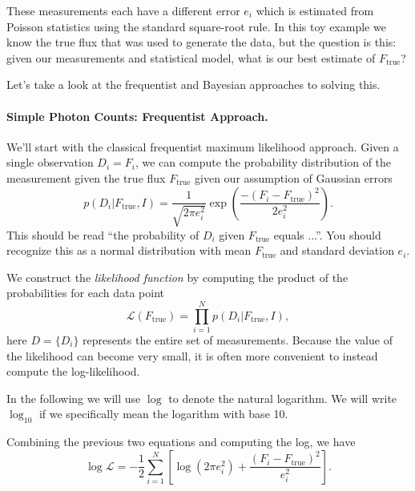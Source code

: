 \documentclass[%
oneside,                 %
final,                   %
10pt]{article}
\newenvironment{notice_mdfboxadmon}[1][]{
\begin{notice_mdfboxmdframed}[frametitle=#1]
}
{
\end{notice_mdfboxmdframed}
}
\begin{document}
These measurements each have a different error $e_i$ which is estimated from Poisson statistics using the standard square-root rule. In this toy example we know the true flux that was used to generate the data, but the question is this: given our measurements and statistical model, what is our best estimate of $F_\mathrm{true}$?

Let's take a look at the frequentist and Bayesian approaches to solving this.

\paragraph{Simple Photon Counts: Frequentist Approach.}
We'll start with the classical frequentist maximum likelihood approach. Given a single observation $D_i = F_i$, we can compute the probability distribution of the measurement given the true flux $F_\mathrm{true}$ given our assumption of Gaussian errors
\begin{equation}
p(D_i | F_\mathrm{true}, I) = \frac{1}{\sqrt{2\pi e_i^2}} \exp \left( \frac{-(F_i-F_\mathrm{true})^2}{2e_i^2} \right).
\end{equation}
This should be read ``the probability of $D_i$ given $F_\mathrm{true}$
equals ...''. You should recognize this as a normal distribution with mean $F_\mathrm{true}$ and standard deviation $e_i$.

We construct the \emph{likelihood function} by computing the product of the probabilities for each data point
\begin{equation}
\mathcal{L}(F_\mathrm{true}) = \prod_{i=1}^N p(D_i | F_\mathrm{true}, I),
\end{equation}
here $D = \{D_i\}$ represents the entire set of measurements. Because the value of the likelihood can become very small, it is often more convenient to instead compute the log-likelihood. 


\begin{notice_mdfboxadmon}[Notice]
In the following we will use $\log$ to denote the natural logarithm. We will write $\log_{10}$ if we specifically mean the logarithm with base 10.
\end{notice_mdfboxadmon} %



Combining the previous two equations and computing the log, we have
\begin{equation}
\log\mathcal{L} = -\frac{1}{2} \sum_{i=1}^N \left[ \log(2\pi e_i^2) +  \frac{(F_i-F_\mathrm{true})^2}{e_i^2} \right].
\end{equation}
\end{document}
